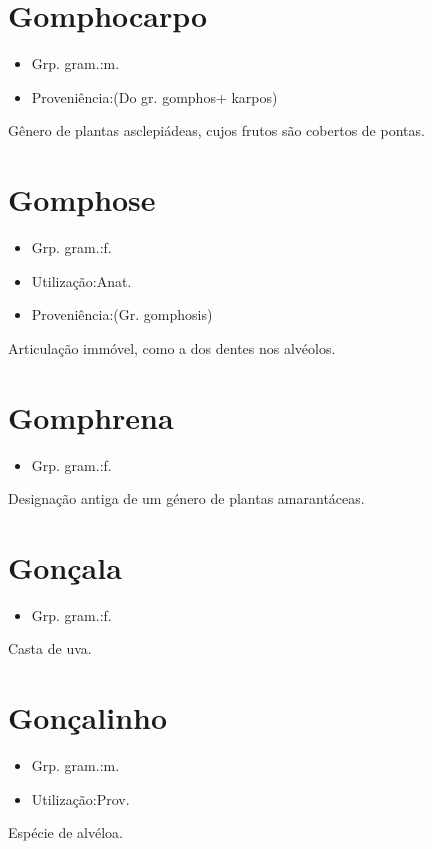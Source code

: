 \section{Gomphocarpo}
\begin{itemize}
\item {Grp. gram.:m.}
\end{itemize}
\begin{itemize}
\item {Proveniência:(Do gr. \textunderscore gomphos\textunderscore  + \textunderscore karpos\textunderscore )}
\end{itemize}
Gênero de plantas asclepiádeas, cujos frutos são cobertos de pontas.
\section{Gomphose}
\begin{itemize}
\item {Grp. gram.:f.}
\end{itemize}
\begin{itemize}
\item {Utilização:Anat.}
\end{itemize}
\begin{itemize}
\item {Proveniência:(Gr. \textunderscore gomphosis\textunderscore )}
\end{itemize}
Articulação immóvel, como a dos dentes nos alvéolos.
\section{Gomphrena}
\begin{itemize}
\item {Grp. gram.:f.}
\end{itemize}
Designação antiga de um género de plantas amarantáceas.
\section{Gonçala}
\begin{itemize}
\item {Grp. gram.:f.}
\end{itemize}
Casta de uva.
\section{Gonçalinho}
\begin{itemize}
\item {Grp. gram.:m.}
\end{itemize}
\begin{itemize}
\item {Utilização:Prov.}
\end{itemize}
Espécie de alvéloa.
